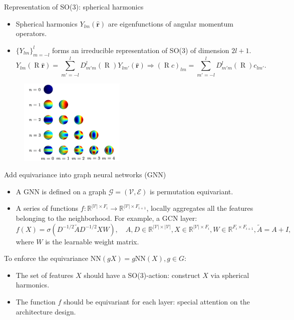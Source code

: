 \begin{frame}{Representation of SO(3): spherical harmonics}
    \begin{itemize}
        \item Spherical harmonics $Y_{lm}(\hat{\mathbf{r}})$ are eigenfunctions of
        angular momentum operators.
        \item $\{Y_{lm}\}_{m=-l}^l$ forms
        an irreducible representation of SO(3) of dimension $2l+1$.
        \begin{equation*}
            Y_{lm}(\operatorname{R}\hat{\mathbf{r}}) = 
            \sum_{m'=-l}^{l} D_{m'm}^l(\operatorname{R}) Y_{lm'}(\hat{\mathbf{r}})
            \Longrightarrow (\operatorname{R}c)_{lm} = \sum_{m'=-l}^{l}
            D_{m'm}^l(\operatorname{R}) c_{lm'}.
        \end{equation*}
    \end{itemize}
    \begin{figure}
        \includegraphics[width=0.45\textwidth]{figures/sh.png}
    \end{figure}
\end{frame}


\begin{frame}{Add equivariance into graph neural networks (GNN)}
    \begin{itemize}
        \item A GNN is defined on a graph $\mathcal{G} = (\mathcal{V}, \mathcal{E})$
        is permutation equivariant.
        \item A series of functions
        $f: \mathbb{R}^{|\mathcal{V}| \times F_i} \rightarrow \mathbb{R}^{|\mathcal{V}| \times F_{i+1}}$,
        locally aggregates all the features belonging to the neighborhood. For example,
        a GCN layer:
        \begin{equation*}
            f(X) = \sigma(D^{-1/2}\widetilde{A}D^{-1/2}XW), \quad 
            A, D \in \mathbb{R}^{|\mathcal{V}| \times |\mathcal{V}|}, X \in \mathbb{R}^{|\mathcal{V}| \times F_i},
            W \in \mathbb{R}^{F_i \times F_{i+1}}, \widetilde{A} = A + I,
        \end{equation*}
        where $W$ is the learnable weight matrix.
    \end{itemize}
    To enforce the equivariance $\text{NN}(gX) = g\text{NN}(X), g \in G$:
    \begin{itemize}
        \item The set of features $X$ should have a SO(3)-action: construct $X$ via 
        spherical harmonics.
        \item The function $f$ should be equivariant for each layer: special attention
        on the architecture design.
    \end{itemize}
\end{frame}


